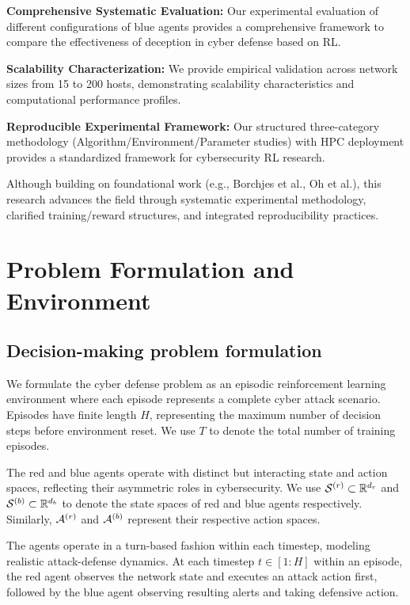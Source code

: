 \documentclass[12pt,oneside]{article}
\begin{document}
\textbf{Comprehensive Systematic Evaluation:} Our experimental evaluation of different configurations of blue agents provides a comprehensive framework to compare the effectiveness of deception in cyber defense based on RL.

\textbf{Scalability Characterization:} We provide empirical validation across network sizes from 15 to 200 hosts, demonstrating scalability characteristics and computational performance profiles.

\textbf{Reproducible Experimental Framework:} Our structured three-category methodology (Algorithm/Environment/Parameter studies) with HPC deployment provides a standardized framework for cybersecurity RL research.

Although building on foundational work (e.g., Borchjes et al., Oh et al.), this research advances the field through systematic experimental methodology, clarified training/reward structures, and integrated reproducibility practices.


\clearpage
\section{Problem Formulation and Environment}

\subsection{Decision-making problem formulation}

We formulate the cyber defense problem as an episodic reinforcement learning environment where each episode represents a complete cyber attack scenario. Episodes have finite length $H$, representing the maximum number of decision steps before environment reset. We use $T$ to denote the total number of training episodes.

The red and blue agents operate with distinct but interacting state and action spaces, reflecting their asymmetric roles in cybersecurity. We use $\mathcal{S}^{(r)} \subset \mathbb{R}^{d_r}$ and $\mathcal{S}^{(b)} \subset \mathbb{R}^{d_b}$ to denote the state spaces of red and blue agents respectively. Similarly, $\mathcal{A}^{(r)}$ and $\mathcal{A}^{(b)}$ represent their respective action spaces.

The agents operate in a turn-based fashion within each timestep, modeling realistic attack-defense dynamics. At each timestep $t \in [1:H]$ within an episode, the red agent observes the network state and executes an attack action first, followed by the blue agent observing resulting alerts and taking defensive action.
\end{document}
